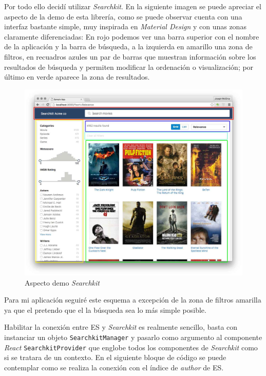 Por todo ello decidí utilizar \textit{Searchkit}. En la siguiente imagen se puede apreciar el aspecto de la demo de esta librería, como se puede observar cuenta con una interfaz bastante simple, muy inspirada en \textit{Material Design} \cite{materialDesign} y con unas zonas claramente diferenciadas: En rojo podemos ver una barra superior con el nombre de la aplicación y la barra de búsqueda, a la izquierda en amarillo una zona de filtros, en recuadros azules un par de barras que muestran información sobre los resultados de búsqueda y permiten modificar la ordenación o visualización; por último en verde aparece la zona de resultados.

\begin{figure}[h]
	
	\centering
	\includegraphics[width=\linewidth]{imagenes/AspectDemoSearchKit}
	\caption{Aspecto demo \textit{Searchkit}}
\end{figure}

Para mi aplicación seguiré este esquema a excepción de la zona de filtros amarilla ya que el pretendo que el la búsqueda sea lo más simple posible.

Habilitar la conexión entre \acrshort{ES} y \textit{Searchkit} es realmente sencillo, basta con instanciar un objeto \texttt{SearchkitManager} y pasarlo como argumento al componente \textit{React} \texttt{SearchkitProvider} que englobe todos los componentes de \textit{Searchkit} como si se tratara de un contexto. En el siguiente bloque de código se puede contemplar como se realiza la conexión con el índice de \textit{author} de \acrshort{ES}.

